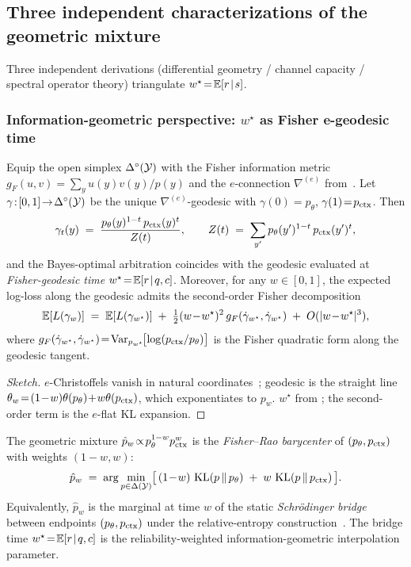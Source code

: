 \subsection{Three independent characterizations of the geometric mixture}
\label{app:three-perspectives}

Three independent derivations (differential geometry / channel
capacity / spectral operator theory) triangulate
$w^\star\!=\!\mathbb{E}[r\!\mid\!s]$.

\subsubsection{Information-geometric perspective: $w^\star$ as Fisher e-geodesic time}
\label{app:info-geometric}

\begin{theorem}
\label{thm:info-geometric}
Equip the open simplex $\Delta^\circ(\mathcal{Y})$ with the Fisher information
metric $g_F(u,v)\!=\!\sum_y u(y)v(y)/p(y)$ and the
$e$-connection $\nabla^{(e)}$ from~\citet{amari1985differential,amari2000methods}.
Let $\gamma\!:\![0,1]\!\to\!\Delta^\circ(\mathcal{Y})$ be the unique
$\nabla^{(e)}$-geodesic with $\gamma(0)\!=\!p_\theta$,
$\gamma(1)\!=\!p_{\mathrm{ctx}}$.  Then
\[
\gamma_t(y)\;=\;\frac{p_\theta(y)^{1-t}\,p_{\mathrm{ctx}}(y)^{t}}{Z(t)},
\qquad
Z(t)\;=\;\sum_{y'} p_\theta(y')^{1-t}\,p_{\mathrm{ctx}}(y')^{t},
\]
and the Bayes-optimal arbitration coincides with the geodesic
evaluated at \emph{Fisher-geodesic time}
$w^\star\!=\!\mathbb{E}[r\!\mid\! q,c]$.  Moreover, for any $w\!\in\![0,1]$,
the expected log-loss along the geodesic admits the second-order
Fisher decomposition
\[
\mathbb{E}[L(\gamma_w)]\;=\;\mathbb{E}[L(\gamma_{w^\star})]
\;+\;\tfrac{1}{2}(w\!-\!w^\star)^{2}\,g_F(\dot\gamma_{w^\star},\dot\gamma_{w^\star})
\;+\;O(|w\!-\!w^\star|^{3}),
\]
where $g_F(\dot\gamma_{w^\star},\dot\gamma_{w^\star})\!=\!\operatorname{Var}_{p_{w^\star}}\!\bigl[\log(p_{\mathrm{ctx}}/p_\theta)\bigr]$
is the Fisher quadratic form along the geodesic tangent.
\end{theorem}

\begin{proof}[Sketch]
$e$-Christoffels vanish in natural coordinates~\citep[Ch.~3]{amari2000methods};
geodesic is the straight line $\theta_w\!=\!(1\!-\!w)\theta(p_\theta)\!+\!w\theta(p_{\mathrm{ctx}})$,
which exponentiates to $p_w$.  $w^\star$ from
; the second-order term is the
$e$-flat KL expansion.
\end{proof}

\begin{corollary}
\label{cor:sinkhorn-arbitration}
The geometric mixture $\hat p_w\!\propto\!p_\theta^{1-w}p_{\mathrm{ctx}}^{w}$
is the \emph{Fisher--Rao barycenter} of $(p_\theta, p_{\mathrm{ctx}})$ with
weights $(1\!-\!w, w)$:
\[
\hat p_w
\;=\;
\arg\min_{p\in\Delta(\mathcal{Y})}
\bigl[\,(1\!-\!w)\,\operatorname{KL}(p\,\|\,p_\theta)\;+\;w\,\operatorname{KL}(p\,\|\,p_{\mathrm{ctx}})\,\bigr].
\]
Equivalently, $\hat p_w$ is the marginal at time $w$ of the
static \emph{Schr\"odinger bridge} between endpoints
$(p_\theta, p_{\mathrm{ctx}})$ under the
relative-entropy construction~\citep[Sec.~4]{leonard2014survey}.
The bridge time $w^\star\!=\!\mathbb{E}[r\!\mid\! q,c]$ is the
reliability-weighted information-geometric interpolation
parameter.
\end{corollary}

